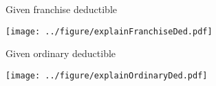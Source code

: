 \documentclass[aspectratio=169]{beamer}
\begin{document}
\begin{frame}{Given franchise deductible}

\centering
\texttt{[image: ../figure/explainFranchiseDed.pdf]}


\end{frame}


\begin{frame}{Given ordinary deductible}

\centering
\texttt{[image: ../figure/explainOrdinaryDed.pdf]}

\end{frame}
\end{document}
